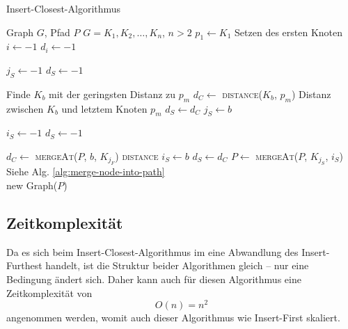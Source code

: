 \begin{algorithm}
    \caption{Insert-Closest-Algorithmus}
    \label{alg:insert-closest}
    \begin{algorithmic}[1]
        \Require Graph $G$, Pfad $P$
        \Require $G = K_1,K_2,\ldots,K_n$, $n > 2$
        \State $p_1 \gets K_1$
        \Comment Setzen des ersten Knoten
        \State $i \gets -1$
        \State $d_i \gets -1$

            \State $j_S \gets -1$
            \State $d_S \gets -1$

                \Comment Finde $K_b$ mit der geringsten Distanz zu $p_m$
                \State $d_C \gets$ \textsc{distance}($K_b$, $p_m$)
                \Comment Distanz zwischen $K_b$ und letztem Knoten $p_m$
                    \State $d_S \gets d_C$
                    \State $j_S \gets b$
                \EndIf
            \EndFor

            \State $i_S \gets -1$
            \State $d_S \gets -1$

                \State $d_C \gets$ \textsc{mergeAt}($P$, $b$, $K_{j_F}$) \textsc{distance}
                    \State $i_S \gets b$
                    \State $d_S \gets d_C$
                \EndIf
            \EndFor
            \State $P \gets$ \textsc{mergeAt}($P$, $K_{j_S}$, $i_S$)
            \Comment Siehe Alg. \vref{alg:merge-node-into-path}
        \EndFor \\
        \Return new Graph($P$)
    \end{algorithmic}
\end{algorithm}

\subsection{Zeitkomplexität}
Da es sich beim Insert-Closest-Algorithmus im eine Abwandlung des Insert-Furthest handelt, ist die Struktur beider Algorithmen gleich -- nur eine Bedingung ändert sich.
Daher kann auch für diesen Algorithmus eine Zeitkomplexität von $$O(n) = n^2$$ angenommen werden, womit auch dieser Algorithmus wie Insert-First skaliert.

